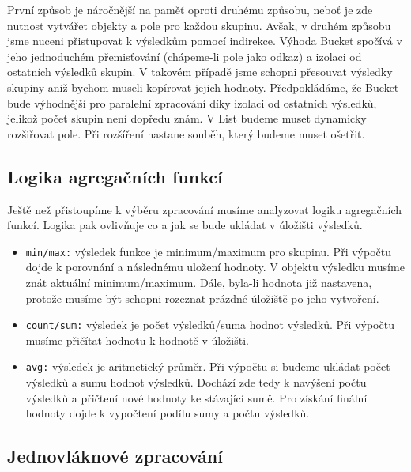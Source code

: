 První způsob je náročnější na paměť oproti druhému způsobu, neboť je zde nutnost vytvářet objekty a pole pro každou skupinu.
Avšak, v druhém způsobu jsme nuceni přistupovat k výsledkům pomocí indirekce.
Výhoda Bucket spočívá v jeho jednoduchém přemisťování (chápeme-li pole jako odkaz) a izolaci od ostatních výsledků skupin.
V takovém případě jsme schopni přesouvat výsledky skupiny aniž bychom museli kopírovat jejich hodnoty.
Předpokládáme, že Bucket bude výhodnější pro paralelní zpracování díky izolaci od ostatních výsledků, jelikož počet skupin není dopředu znám.
V List budeme muset dynamicky rozšiřovat pole.
Při rozšíření nastane souběh, který budeme muset ošetřit.

\subsection{Logika agregačních funkcí}

Ještě než přistoupíme k výběru zpracování musíme analyzovat logiku agregačních funkcí.
Logika pak ovlivňuje co a jak se bude ukládat v úložišti výsledků.

\begin{itemize}
\item \texttt{min/max:} výsledek funkce je minimum/maximum pro skupinu. 
Při výpočtu dojde k porovnání a následnému uložení hodnoty.
V objektu výsledku musíme znát aktuální minimum/maximum.
Dále, byla-li hodnota již nastavena, protože musíme být schopni rozeznat prázdné úložiště po jeho vytvoření.


\item \texttt{count/sum:} výsledek je počet výsledků/suma hodnot výsledků. 
Při výpočtu musíme přičítat hodnotu k hodnotě v úložišti.

\item \texttt{avg:} výsledek je aritmetický průměr.
Při výpočtu si budeme ukládat počet výsledků a sumu hodnot výsledků.
Dochází zde tedy k navýšení počtu výsledků a přičtení nové hodnoty ke stávající sumě.
Pro získání finální hodnoty dojde k vypočtení podílu sumy a počtu výsledků.
\end{itemize}

\subsection{Jednovláknové zpracování} \label{anal.groupby.singlethread}

